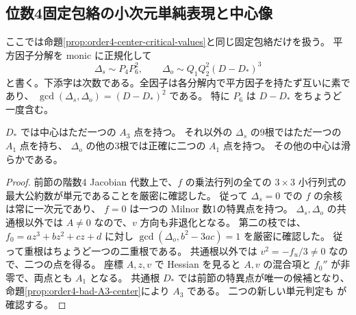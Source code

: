 \subsection{位数4固定包絡の小次元単純表現と中心像}
\label{subsec:order4-small-reps}
ここでは命題\ref{prop:order4-center-critical-values}と同じ固定包絡だけを扱う。
平方因子分解を monic に正規化して
\[
 \Delta_s\sim P_4 P_6^2,\qquad
 \Delta_o\sim Q_1 Q_2^2(D-D_*)^3
\]
と書く。下添字は次数である。全因子は各分解内で平方因子を持たず互いに素であり、
$\gcd(\Delta_s,\Delta_o)=(D-D_*)^2$ である。
特に $P_6$ は $D-D_*$ をちょうど一度含む。

\begin{lemma}[全中心特異点の型]
\label{lem:order4-all-center-nodes}
$D_*$ では中心はただ一つの $A_3$ 点を持つ。
それ以外の $\Delta_s$ の9根ではただ一つの $A_1$ 点を持ち、
$\Delta_o$ の他の3根では正確に二つの $A_1$ 点を持つ。
その他の中心は滑らかである。
\end{lemma}
\begin{proof}
前節の階数4 Jacobian 代数上で、$f$ の乗法行列の全ての $3\times3$ 小行列式の
最大公約数が単元であることを厳密に確認した。
従って $\Delta_s=0$ での $f$ の余核は常に一次元であり、
$f=0$ は一つの Milnor 数1の特異点を持つ。
$\Delta_s,\Delta_o$ の共通根以外では $A\ne0$ なので、$v$ 方向も非退化となる。
第二の枝では、$f_0=az^3+bz^2+cz+d$ に対し
$\gcd(\Delta_o,b^2-3ac)=1$ を厳密に確認した。
従って重根はちょうど一つの二重根である。
共通根以外では $v^2=-f_u/3\ne0$ なので、二つの点を得る。
座標 $A,z,v$ で Hessian を見ると $A,v$ の混合項と $f_0''$ が非零で、両点とも $A_1$ となる。
共通根 $D_*$ では前節の特異点が唯一の候補となり、
命題\ref{prop:order4-bad-A3-center}により $A_3$ である。
二つの新しい単元判定も  が確認する。
\end{proof}

